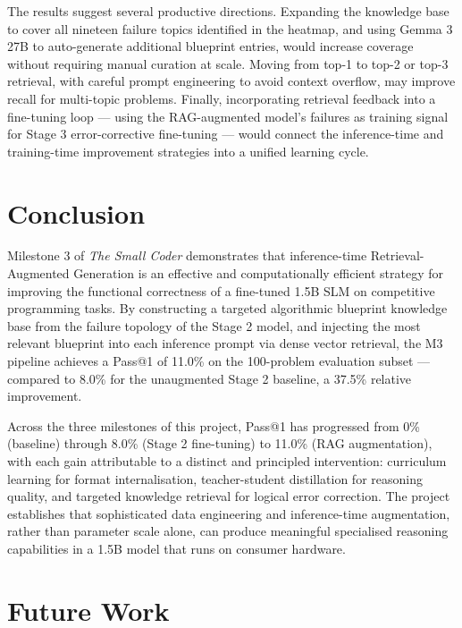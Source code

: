 \documentclass[12pt,a4paper]{article}
\begin{document}
The results suggest several productive directions. Expanding the knowledge base to cover all nineteen failure topics identified in the heatmap, and using Gemma 3 27B to auto-generate additional blueprint entries, would increase coverage without requiring manual curation at scale. Moving from top-1 to top-2 or top-3 retrieval, with careful prompt engineering to avoid context overflow, may improve recall for multi-topic problems. Finally, incorporating retrieval feedback into a fine-tuning loop --- using the RAG-augmented model's failures as training signal for Stage 3 error-corrective fine-tuning --- would connect the inference-time and training-time improvement strategies into a unified learning cycle.

\section{Conclusion}
\label{sec:conclusion}

Milestone 3 of \textit{The Small Coder} demonstrates that inference-time Retrieval-Augmented Generation is an effective and computationally efficient strategy for improving the functional correctness of a fine-tuned 1.5B SLM on competitive programming tasks. By constructing a targeted algorithmic blueprint knowledge base from the failure topology of the Stage 2 model, and injecting the most relevant blueprint into each inference prompt via dense vector retrieval, the M3 pipeline achieves a Pass@1 of 11.0\% on the 100-problem evaluation subset --- compared to 8.0\% for the unaugmented Stage 2 baseline, a 37.5\% relative improvement.

Across the three milestones of this project, Pass@1 has progressed from 0\% (baseline) through 8.0\% (Stage 2 fine-tuning) to 11.0\% (RAG augmentation), with each gain attributable to a distinct and principled intervention: curriculum learning for format internalisation, teacher-student distillation for reasoning quality, and targeted knowledge retrieval for logical error correction. The project establishes that sophisticated data engineering and inference-time augmentation, rather than parameter scale alone, can produce meaningful specialised reasoning capabilities in a 1.5B model that runs on consumer hardware.

\section{Future Work}
\label{sec:future}
\end{document}
